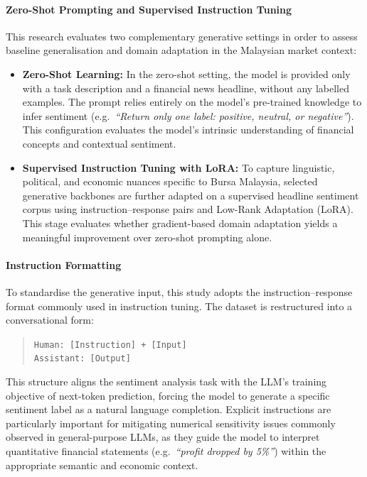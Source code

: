 \documentclass[12pt]{ucetd}
\begin{document}
\paragraph{Zero-Shot Prompting and Supervised Instruction Tuning}

This research evaluates two complementary generative settings in order to assess baseline generalisation and domain adaptation in the Malaysian market context:

\begin{itemize}
    \item \textbf{Zero-Shot Learning:}
    In the zero-shot setting, the model is provided only with a task description and a financial news headline, without any labelled examples. The prompt relies entirely on the model's pre-trained knowledge to infer sentiment (e.g.\ \emph{``Return only one label: positive, neutral, or negative''}). This configuration evaluates the model's intrinsic understanding of financial concepts and contextual sentiment.

    \item \textbf{Supervised Instruction Tuning with LoRA:}
    To capture linguistic, political, and economic nuances specific to Bursa Malaysia, selected generative backbones are further adapted on a supervised headline sentiment corpus using instruction--response pairs and Low-Rank Adaptation (LoRA). This stage evaluates whether gradient-based domain adaptation yields a meaningful improvement over zero-shot prompting alone.
\end{itemize}

\paragraph{Instruction Formatting}

To standardise the generative input, this study adopts the instruction--response format commonly used in instruction tuning. The dataset is restructured into a conversational form:

\begin{quote}
\texttt{Human: [Instruction] + [Input]} \\
\texttt{Assistant: [Output]}
\end{quote}

This structure aligns the sentiment analysis task with the LLM's training objective of next-token prediction, forcing the model to generate a specific sentiment label as a natural language completion. Explicit instructions are particularly important for mitigating numerical sensitivity issues commonly observed in general-purpose LLMs, as they guide the model to interpret quantitative financial statements (e.g.\ \emph{``profit dropped by 5\%''}) within the appropriate semantic and economic context.
\end{document}
